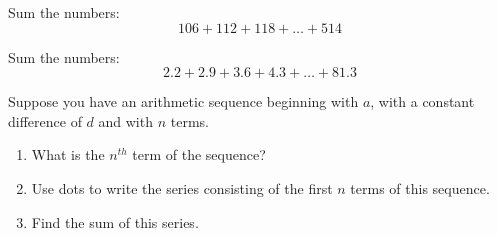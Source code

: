 \documentclass{ximera}
\begin{document}
\begin{problem}
Sum the numbers:  
\[
106 + 112 + 118 + \dots + 514
\]
\end{problem}

\begin{problem}
Sum the numbers:
\[
2.2 + 2.9 + 3.6 + 4.3 + \dots + 81.3
\]
\end{problem}


\begin{problem}
Suppose you have an arithmetic sequence beginning with $a$, with a constant difference of $d$ and with $n$ terms.  
\begin{enumerate}
\item What is the $n^{th}$ term of the sequence?  
\item Use dots to write the series consisting of the first $n$ terms of this sequence.
\item Find the sum of this series.  
\end{enumerate}
\end{problem}
\end{document}
